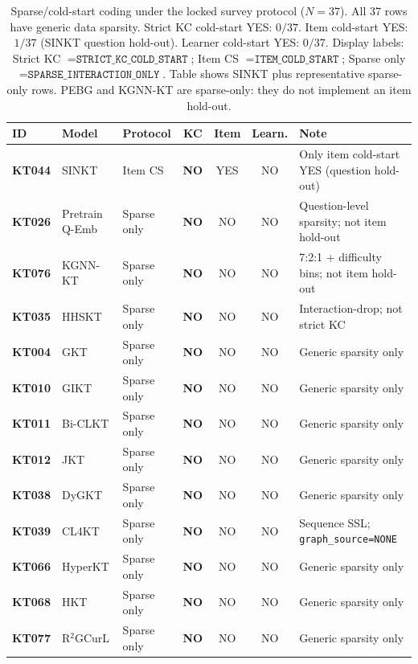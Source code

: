 \documentclass[lettersize,journal]{IEEEtran}
\begin{document}
\begin{table}[t]
\caption{Sparse/cold-start coding under the locked survey protocol ($N=37$). All 37 rows have generic data sparsity. Strict KC cold-start YES: $0/37$. Item cold-start YES: $1/37$ (SINKT question hold-out). Learner cold-start YES: $0/37$. Display labels: Strict KC $=\texttt{STRICT\_KC\_COLD\_START}$; Item CS $=\texttt{ITEM\_COLD\_START}$; Sparse only $=\texttt{SPARSE\_INTERACTION\_ONLY}$. Table shows SINKT plus representative sparse-only rows. PEBG and KGNN-KT are sparse-only: they do not implement an item hold-out.}
\label{tab:sparse_taxonomy}
\centering
\footnotesize
\setlength{\tabcolsep}{3.2pt}
\begin{tabular}{@{}ll l ccc p{3.55cm}@{}}
\toprule
\textbf{ID} & \textbf{Model} & \textbf{Protocol} & \textbf{KC} & \textbf{Item} & \textbf{Learn.} & \textbf{Note} \\
\midrule
\textbf{KT044} & SINKT \cite{KT044_SINKT_2024} & Item CS & \textbf{NO} & YES & NO & Only item cold-start YES (question hold-out) \\
\textbf{KT026} & Pretrain Q-Emb \cite{KT026_PretrainQ_2020} & Sparse only & \textbf{NO} & NO & NO & Question-level sparsity; not item hold-out \\
\textbf{KT076} & KGNN-KT \cite{KT076_KGNNKT_2025} & Sparse only & \textbf{NO} & NO & NO & 7:2:1 + difficulty bins; not item hold-out \\
\textbf{KT035} & HHSKT \cite{KT035_HHSKT_2023} & Sparse only & \textbf{NO} & NO & NO & Interaction-drop; not strict KC \\
\textbf{KT004} & GKT \cite{KT004_GKT_2019} & Sparse only & \textbf{NO} & NO & NO & Generic sparsity only \\
\textbf{KT010} & GIKT \cite{KT010_GIKT_2021} & Sparse only & \textbf{NO} & NO & NO & Generic sparsity only \\
\textbf{KT011} & Bi-CLKT \cite{KT011_BiCLKT_2022} & Sparse only & \textbf{NO} & NO & NO & Generic sparsity only \\
\textbf{KT012} & JKT \cite{KT012_JKT_2021} & Sparse only & \textbf{NO} & NO & NO & Generic sparsity only \\
\textbf{KT038} & DyGKT \cite{KT038_DyGKT_2024} & Sparse only & \textbf{NO} & NO & NO & Generic sparsity only \\
\textbf{KT039} & CL4KT \cite{KT039_CL4KT_2022} & Sparse only & \textbf{NO} & NO & NO & Sequence SSL; \texttt{graph\_source=NONE} \\
\textbf{KT066} & HyperKT \cite{KT066_HyperKT_2025} & Sparse only & \textbf{NO} & NO & NO & Generic sparsity only \\
\textbf{KT068} & HKT \cite{KT068_HKT_2025} & Sparse only & \textbf{NO} & NO & NO & Generic sparsity only \\
\textbf{KT077} & R$^2$GCurL \cite{KT077_R2GCurL_2026} & Sparse only & \textbf{NO} & NO & NO & Generic sparsity only \\
\bottomrule
\end{tabular}
\end{table}
\end{document}
